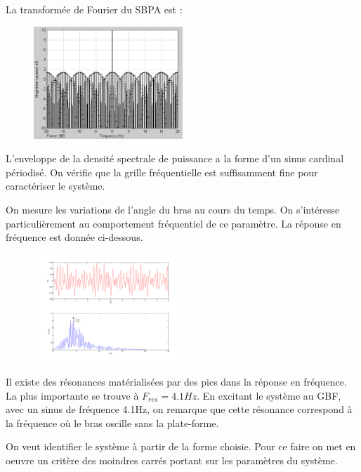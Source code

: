 \documentclass[../../Cours_M1.tex]{subfiles}
\begin{document}
La transformée de Fourier du SBPA est :

\begin{figure}
\begin{center}
\includegraphics[width=0.5\textwidth]{spectroutroum.PNG}
\end{center}
\end{figure}

L'enveloppe de la densité spectrale de puissance a la forme d'un sinus cardinal périodisé. On vérifie que la grille fréquentielle est suffisamment fine pour caractériser le système.

On mesure les variations de l'angle du bras au cours du temps. On s'intéresse particulièrement au comportement fréquentiel de ce paramètre. La réponse en fréquence est donnée ci-dessous.


\begin{figure}[h!]
\begin{center}
\includegraphics[width=0.5\textwidth]{FFTBG.png}
\end{center}
\end{figure}

Il existe des résonances matérialisées par des pics dans la réponse en fréquence. La plus importante se trouve à $F_{res} = 4.1Hz$. En excitant le système au GBF, avec un sinus de fréquence 4.1Hz, on remarque que cette résonance correspond à la fréquence où le bras oscille sans la plate-forme.

On veut identifier le système à partir de la forme choisie. Pour ce faire on met en oeuvre un critère des moindres carrés portant sur les paramètres du système. 
\end{document}
